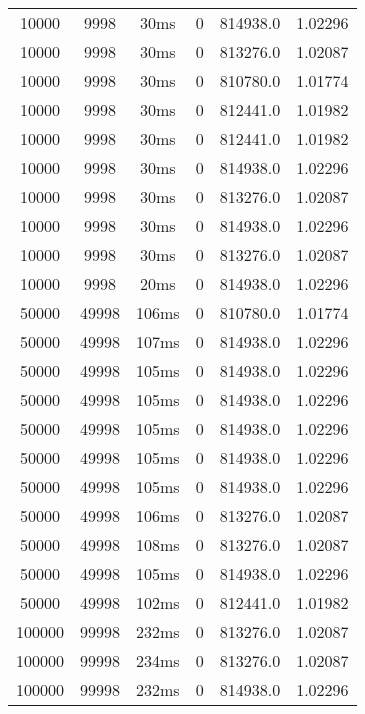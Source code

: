 \documentclass[./main.tex]{subfiles}
\begin{document}
\begin{table}
\begin{tabular}{ c | c | c | c | c | c }
        10000 & 9998 & 30ms & 0 & 814938.0 & 1.02296 \\
        \rowcolor{lightgray} 10000 & 9998 & 30ms & 0 & 813276.0 & 1.02087 \\
        10000 & 9998 & 30ms & 0 & 810780.0 & 1.01774 \\
        10000 & 9998 & 30ms & 0 & 812441.0 & 1.01982 \\
        10000 & 9998 & 30ms & 0 & 812441.0 & 1.01982 \\
        10000 & 9998 & 30ms & 0 & 814938.0 & 1.02296 \\
        \rowcolor{lightgray} 10000 & 9998 & 30ms & 0 & 813276.0 & 1.02087 \\
        10000 & 9998 & 30ms & 0 & 814938.0 & 1.02296 \\
        \rowcolor{lightgray} 10000 & 9998 & 30ms & 0 & 813276.0 & 1.02087 \\
        10000 & 9998 & 20ms & 0 & 814938.0 & 1.02296 \\
        \hline
        50000 & 49998 & 106ms & 0 & 810780.0 & 1.01774 \\
        \rowcolor{lightgray} 50000 & 49998 & 107ms & 0 & 814938.0 & 1.02296 \\
        \rowcolor{lightgray} 50000 & 49998 & 105ms & 0 & 814938.0 & 1.02296 \\
        \rowcolor{lightgray} 50000 & 49998 & 105ms & 0 & 814938.0 & 1.02296 \\
        \rowcolor{lightgray} 50000 & 49998 & 105ms & 0 & 814938.0 & 1.02296 \\
        \rowcolor{lightgray} 50000 & 49998 & 105ms & 0 & 814938.0 & 1.02296 \\
        \rowcolor{lightgray} 50000 & 49998 & 105ms & 0 & 814938.0 & 1.02296 \\
        50000 & 49998 & 106ms & 0 & 813276.0 & 1.02087 \\
        50000 & 49998 & 108ms & 0 & 813276.0 & 1.02087 \\
        \rowcolor{lightgray} 50000 & 49998 & 105ms & 0 & 814938.0 & 1.02296 \\
        50000 & 49998 & 102ms & 0 & 812441.0 & 1.01982 \\
        \hline
        \rowcolor{lightgray} 100000 & 99998 & 232ms & 0 & 813276.0 & 1.02087 \\
        \rowcolor{lightgray} 100000 & 99998 & 234ms & 0 & 813276.0 & 1.02087 \\
        100000 & 99998 & 232ms & 0 & 814938.0 & 1.02296 \\

\end{tabular}
\end{table}
\end{document}

